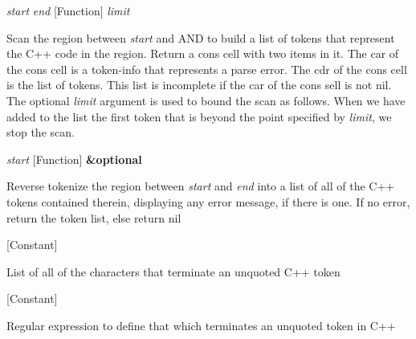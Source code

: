 \vspace{1em}
\noindent
{}
\usebox{\funcname}\emph{start} \emph{end}
 \hfill [Function]
\hspace*{\wd\funcname}\emph{limit}

\begin{doc-string}
Scan the region between \emph{start} and AND to build a list of tokens that represent the C++
code in the region.  Return a cons cell with two items in it.  The car of the cons cell
is a token-info that represents a parse error.  The cdr of the cons cell is the list of
tokens.  This list is incomplete if the car of the cons sell is not nil.  The optional
\emph{limit} argument is used to bound the scan as follows.  When we have added to the list the
first token that is beyond the point specified by \emph{limit}, we stop the scan.
\end{doc-string}

\vspace{1em}
\noindent
{}
\usebox{\funcname}\emph{start}
 \hfill [Function]
\hspace*{\wd\funcname}\textbf{\&optional}
\hspace*{\wd\funcname}

\begin{doc-string}
Reverse tokenize the region between \emph{start} and \emph{end} into a list of all of the C++
tokens contained therein, displaying any error message, if there is one.  If no
error, return the token list, else return nil
\end{doc-string}

\vspace{1em}
\noindent
{}
\usebox{\funcname}
 \hfill [Constant]

\begin{doc-string}
List of all of the characters that terminate an unquoted C++ token
\end{doc-string}

\vspace{1em}
\noindent
{}
\usebox{\funcname}
 \hfill [Constant]

\begin{doc-string}
Regular expression to define that which terminates an unquoted token in C++
\end{doc-string}

